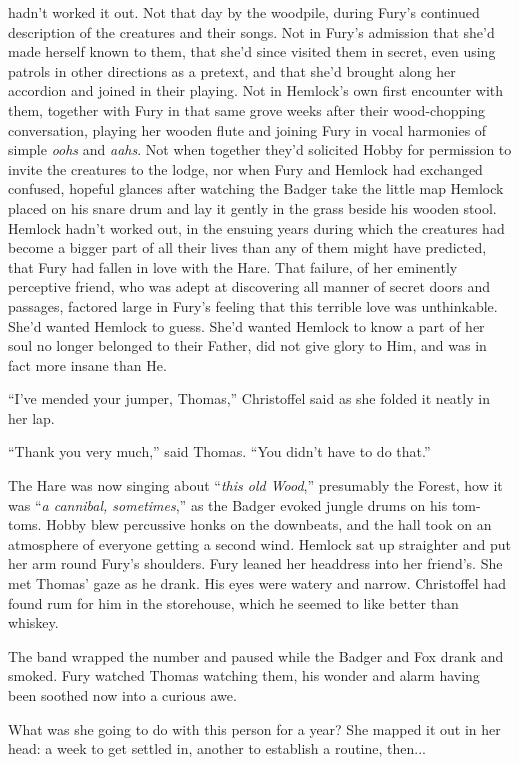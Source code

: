 \documentclass[11pt,a5paper]{article}
\begin{document}
 hadn't worked it out. Not that day by the woodpile, during Fury's continued description of the creatures and their songs. Not in Fury's admission that she'd made herself known to them, that she'd since visited them in secret, even using patrols in other directions as a pretext, and that she'd brought along her accordion and joined in their playing. Not in Hemlock's own first encounter with them, together with Fury in that same grove weeks after their wood-chopping conversation, playing her wooden flute and joining Fury in vocal harmonies of simple \emph{oohs} and \emph{aahs}.  Not when together they'd solicited Hobby for permission to invite the creatures to the lodge, nor when Fury and Hemlock had exchanged confused, hopeful glances after watching the Badger take the little map Hemlock placed on his snare drum and lay it gently in the grass beside his wooden stool. Hemlock hadn't worked out, in the ensuing years during which the creatures had become a bigger part of all their lives than any of them might have predicted, that Fury had fallen in love with the Hare. That failure, of her eminently perceptive friend, who was adept at discovering all manner of secret doors and passages, factored large in Fury's feeling that this terrible love was unthinkable. She'd wanted Hemlock to guess. She'd wanted Hemlock to know a part of her soul no longer belonged to their Father, did not give glory to Him, and was in fact more insane than He.

``I've mended your jumper, Thomas,'' Christoffel said as she folded it neatly in her lap.

``Thank you very much,'' said Thomas. ``You didn't have to do that.''

The Hare was now singing about ``\emph{this old Wood},'' presumably the Forest, how it was ``\emph{a cannibal, sometimes},'' as the Badger evoked jungle drums on his tom-toms. Hobby blew percussive honks on the downbeats, and the hall took on an atmosphere of everyone getting a second wind. Hemlock sat up straighter and put her arm round Fury's shoulders. Fury leaned her headdress into her friend's. She met Thomas' gaze as he drank. His eyes were watery and narrow. Christoffel had found rum for him in the storehouse, which he seemed to like better than whiskey.

The band wrapped the number and paused while the Badger and Fox drank and smoked. Fury watched Thomas watching them, his wonder and alarm having been soothed now into a curious awe.

What was she going to do with this person for a year? She mapped it out in her head: a week to get settled in, another to establish a routine, then...
\end{document}
